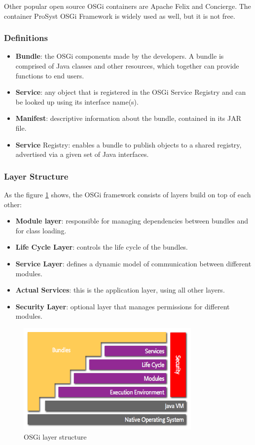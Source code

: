 Other popular open source OSGi containers are Apache Felix and Concierge. The container ProSyst OSGi Framework is widely used as
well, but it is not free.

\subsubsection{Definitions}
\begin{itemize}
	\item \textbf{Bundle}: the OSGi components made by the developers. A bundle is comprised of Java classes and other resources,
	which together can provide functions to end users.
	\item \textbf{Service}: any object that is registered in the OSGi Service Registry and can be looked up using its interface name(s).
	\item \textbf{Manifest}: descriptive information about the bundle, contained in its JAR file.
	\item \textbf{Service} Registry: enables a bundle to publish objects to a shared registry, advertised via a given set of Java interfaces.
\end{itemize}

\subsubsection{Layer Structure}
As the figure \ref{fig:osgi-layering} shows, the OSGi framework consists of layers build on top of each other:

\begin{itemize}
	\item \textbf{Module layer}: responsible for managing dependencies between bundles and for class loading.
	\item \textbf{Life Cycle Layer}: controls the life cycle of the bundles.
	\item \textbf{Service Layer}: defines a dynamic model of communication between different modules.
	\item \textbf{Actual Services}: this is the application layer, using all other layers.
	\item \textbf{Security Layer}: optional layer that manages permissions for different modules.
\end{itemize}

\begin{figure}
	\centering
	\includegraphics[width=0.8\textwidth]{images/Chapter_06/osgi-layering.png}
	\caption{OSGi layer structure}
	\label{fig:osgi-layering}
\end{figure}

